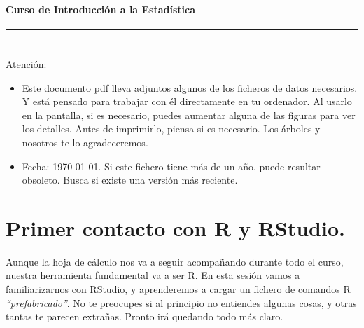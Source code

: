 \documentclass[10pt,a4paper]{article}\usepackage[]{graphicx}\usepackage[]{color}
\newcounter {cont01}
\begin{document}

\paragraph{\hspace{6.3cm}Curso de Introducción a la Estadística\\[2mm]} \noindent\hrule

\setcounter{section}{0}
\section*{\hspace{-0.1cm}}

Atención:
{\small
\begin{itemize}
  \item Este documento pdf lleva adjuntos algunos de los ficheros de datos necesarios. Y está pensado para trabajar con él directamente en tu ordenador. Al usarlo en la pantalla, si es necesario, puedes aumentar alguna de las figuras para ver los detalles. Antes de imprimirlo, piensa si es necesario. Los árboles y nosotros te lo agradeceremos.
  \item Fecha: \today. Si este fichero tiene más de un año, puede resultar obsoleto. Busca si existe una versión más reciente.
\end{itemize}


{\small
\setcounter{tocdepth}{1}
\tableofcontents
}
}

\section{Primer contacto con R y RStudio.}
\label{tut02:sec:PrimerContactoR}

Aunque la hoja de cálculo nos va a seguir acompañando durante todo el curso, nuestra herramienta fundamental va a ser R. En esta sesión vamos a familiarizarnos con RStudio, y aprenderemos a cargar un fichero de comandos R {\em ``prefabricado''}. No te preocupes si al principio no entiendes algunas cosas, y otras tantas te parecen extrañas. Pronto irá quedando todo más claro.
\end{document}
